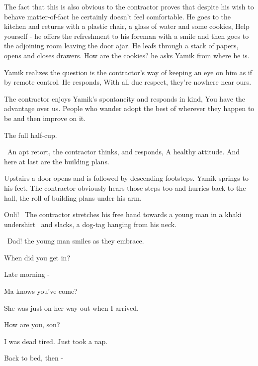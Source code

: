 \documentclass[letterpaper]{article}
\begin{document}
The fact that this is also obvious to the contractor proves that despite his wish to behave matter-of-fact he certainly
doesn't feel comfortable. He goes to the kitchen and returns with a plastic chair, a glass of water and some cookies,
{\textquotedbl}Help yourself - {\textquotedbl} he offers the refreshment to his foreman with a smile and then goes to
the adjoining room leaving the door ajar. He leafs through a stack of papers, opens and closes drawers.
{\textquotedbl}How are the cookies?{\textquotedbl} he asks Yamik from where he is. 

Yamik realizes the question is the contractor's way of keeping an eye on him as if by remote control. He responds,
{\textquotedbl}With all due respect, they're nowhere near ours.{\textquotedbl} 

The contractor enjoys Yamik's spontaneity and responds in kind, {\textquotedbl}You have the advantage over us. People
who wander adopt the best of wherever they happen to be and then improve on it.{\textquotedbl} 

{\textquotedbl}The full half-cup.{\textquotedbl}

~An apt retort, the contractor thinks, and responds, {\textquotedbl}A healthy attitude. And here at last are the
building plans.{\textquotedbl}

Upstairs a door opens and is followed by descending footsteps. Yamik springs to his feet. The contractor obviously hears
those steps too and hurries back to the hall, the roll of building plans under his arm. 

{\textquotedbl}Ouli!{\textquotedbl} \ The contractor stretches his free hand towards a young man in a khaki undershirt
\textcolor{red}{\ }and slacks,\textcolor{red}{ }a dog-tag hanging from his neck.

~{\textquotedbl}Dad!{\textquotedbl} the young man smiles as they embrace. 

{\textquotedbl}When did you get in?{\textquotedbl} 

{\textquotedbl}Late morning -{\textquotedbl} 

{\textquotedbl}Ma knows you've come?{\textquotedbl} 

{\textquotedbl}She was just on her way out when I arrived.{\textquotedbl} 

{\textquotedbl}How are you, son?{\textquotedbl} 

{\textquotedbl}I was dead tired. Just took a nap.{\textquotedbl} 

{\textquotedbl}Back to bed, then -{\textquotedbl} 
\end{document}

